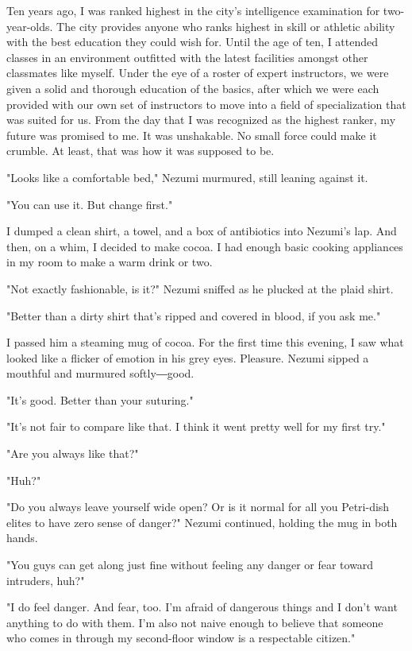 Ten years ago, I was ranked highest in the city's intelligence
examination for two-year-olds. The city provides anyone who ranks
highest in skill or athletic ability with the best education they could
wish for. Until the age of ten, I attended classes in an environment
outfitted with the latest facilities amongst other classmates like
myself. Under the eye of a roster of expert instructors, we were given a
solid and thorough education of the basics, after which we were each
provided with our own set of instructors to move into a field of
specialization that was suited for us. From the day that I was
recognized as the highest ranker, my future was promised to me. It was
unshakable. No small force could make it crumble. At least, that was how
it was supposed to be.

\myspace

"Looks like a comfortable bed," Nezumi murmured, still leaning against
it.

"You can use it. But change first."

I dumped a clean shirt, a towel, and a box of antibiotics into Nezumi's
lap. And then, on a whim, I decided to make cocoa. I had enough basic
cooking appliances in my room to make a warm drink or two.

"Not exactly fashionable, is it?" Nezumi sniffed as he plucked at the
plaid shirt.

"Better than a dirty shirt that's ripped and covered in blood, if you
ask me."

I passed him a steaming mug of cocoa. For the first time this evening, I
saw what looked like a flicker of emotion in his grey eyes. Pleasure.
Nezumi sipped a mouthful and murmured softly―good.

"It's good. Better than your suturing."

"It's not fair to compare like that. I think it went pretty well for my
first try."

"Are you always like that?"

"Huh?"

"Do you always leave yourself wide open? Or is it normal for all you
Petri-dish elites to have zero sense of danger?" Nezumi continued,
holding the mug in both hands.

"You guys can get along just fine without feeling any danger or fear
toward intruders, huh?"

"I do feel danger. And fear, too. I'm afraid of dangerous things and I
don't want anything to do with them. I'm also not naive enough to
believe that someone who comes in through my second-floor window is a
respectable citizen."

